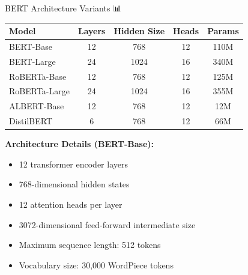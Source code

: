 \documentclass[aspectratio=169]{beamer}
\begin{document}
\begin{frame}[shrink=10]{BERT Architecture Variants 📊}
\begin{center}
\begin{tabular}{lcccc}
\toprule
\textbf{Model} & \textbf{Layers} & \textbf{Hidden Size} & \textbf{Heads} & \textbf{Params} \\
\midrule
BERT-Base & 12 & 768 & 12 & 110M \\
BERT-Large & 24 & 1024 & 16 & 340M \\
RoBERTa-Base & 12 & 768 & 12 & 125M \\
RoBERTa-Large & 24 & 1024 & 16 & 355M \\
ALBERT-Base & 12 & 768 & 12 & 12M \\
DistilBERT & 6 & 768 & 12 & 66M \\
\bottomrule
\end{tabular}
\end{center}

\vspace{1em}

\textbf{Architecture Details (BERT-Base):}
\begin{itemize}\setlength{\itemsep}{0pt}
    \item 12 transformer encoder layers
    \item 768-dimensional hidden states
    \item 12 attention heads per layer
    \item 3072-dimensional feed-forward intermediate size
    \item Maximum sequence length: 512 tokens
    \item Vocabulary size: 30,000 WordPiece tokens
\end{itemize}
\end{frame}
\end{document}
